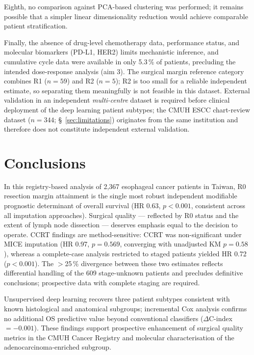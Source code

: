 \documentclass[12pt,a4paper]{article}
\begin{document}
Eighth, no comparison against PCA-based clustering was performed; it remains
possible that a simpler linear dimensionality reduction would achieve
comparable patient stratification.

Finally, the absence of drug-level chemotherapy data, performance status,
and molecular biomarkers (PD-L1, HER2) limits mechanistic inference, and
cumulative cycle data were available in only 5.3\,\% of patients,
precluding the intended dose-response analysis (aim 3). The surgical margin
reference category combines R1 ($n = 59$) and R2 ($n = 5$); R2 is too small
for a reliable independent estimate, so separating them meaningfully is not
feasible in this dataset. External validation in an independent
\textit{multi-centre} dataset is required before clinical deployment of the
deep learning patient subtypes; the CMUH ESCC chart-review dataset
($n = 344$; §~\ref{sec:limitations}) originates from the same institution
and therefore does not constitute independent external validation.

\section{Conclusions}

In this registry-based analysis of 2,367 esophageal cancer patients in
Taiwan, R0 resection margin attainment is the single most robust
independent modifiable prognostic determinant of overall survival
(HR 0.63, $p < 0.001$, consistent across all imputation approaches).
Surgical quality --- reflected by R0 status and the extent of lymph node
dissection --- deserves emphasis equal to the decision to operate. CCRT
findings are method-sensitive: CCRT was non-significant under MICE
imputation (HR 0.97, $p = 0.569$, converging with unadjusted KM
$p = 0.58$), whereas a complete-case analysis restricted to staged
patients yielded HR 0.72 ($p < 0.001$). The $>$25\,\% divergence
between these two estimates reflects differential handling of the 609
stage-unknown patients and precludes definitive conclusions; prospective
data with complete staging are required.

Unsupervised deep learning recovers three patient subtypes consistent with
known histological and anatomical subgroups; incremental Cox analysis
confirms no additional OS predictive value beyond conventional classifiers
($\Delta$C-index $= -0.001$). These findings support prospective
enhancement of surgical quality metrics in the CMUH Cancer Registry and
molecular characterisation of the adenocarcinoma-enriched subgroup.
\end{document}
